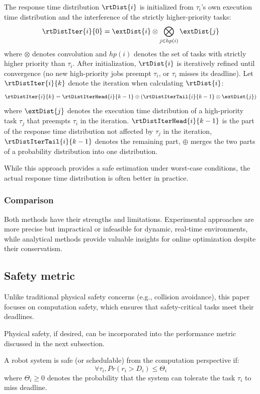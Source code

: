     The response time distribution $\rtDist{i}$ is initialized from $\tau_i$'s own execution time distribution and the interference of the strictly higher-priority tasks:
	\begin{equation}
		\rtDistIter{i}{0} = \extDist{i} \otimes \bigotimes_{j \in hp(i)} \extDist{j}
	\end{equation}
	where $\otimes$ denotes convolution and $hp(i)$ denotes the set of tasks with strictly higher priority than $\tau_i$.
    After initialization, $\rtDist{i}$ is iteratively refined until convergence (\ie no new high-priority jobs preempt $\tau_i$, or $\tau_i$ misses its deadline).
    Let $\rtDistIter{i}{k}$ denote the  iteration when calculating $\rtDist{i}$:
	\begin{equation}
		\rtDistIter{i}{k} = \rtDistIterHead{i}{k-1} \oplus (\rtDistIterTail{i}{k-1} \otimes \extDist{j})
		\label{eq_prob_rta}
	\end{equation}
	where $\extDist{j}$ denotes the execution time distribution of a high-priority task $\tau_j$ that preempts $\tau_i$ in the  iteration.
    $\rtDistIterHead{i}{k-1}$ is the part of the response time distribution not affected by $\tau_j$ in the  iteration, $\rtDistIterTail{i}{k-1}$ denotes the remaining part, $\oplus$ merges the two parts of a probability distribution into one distribution.

    While this approach provides a safe estimation under worst-case conditions, the actual response time distribution is often better in practice.

    \subsubsection{Comparison}
    Both methods have their strengths and limitations.
    Experimental approaches are more precise but impractical or infeasible for dynamic, real-time environments, while analytical methods provide valuable insights for online optimization despite their conservatism.

	\subsection{Safety metric}
    Unlike traditional physical safety concerns (e.g., collision avoidance), this paper focuses on computation safety, which ensures that safety-critical tasks meet their deadlines.

    Physical safety, if desired, can be incorporated into the performance metric discussed in the next subsection.
	\begin{definition}
		A robot system is safe (or schedulable) from the computation perspective if:
		\begin{equation}
			\forall \tau_i, Pr(r_i > D_i) \leq \Theta_i
			\label{eq_safety}
		\end{equation}
		where $\Theta_i \geq 0$ denotes the probability that the system can tolerate the task $\tau_i$ to miss deadline.
	\end{definition}

